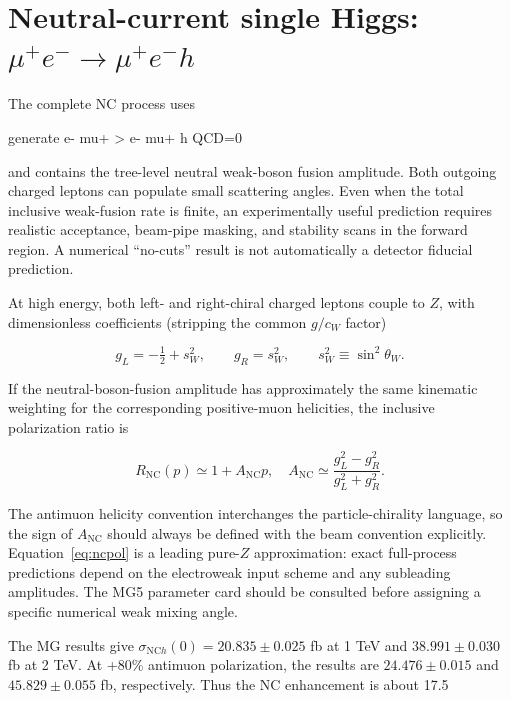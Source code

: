 \documentclass[12pt,a4paper]{article}
\newcommand{\newnote}{\clearpage}
\newcommand{\NC}{\mathrm{NC}}
\begin{document}
\newnote

\section{Neutral-current single Higgs: $\mu^+e^-\to\mu^+e^-h$}
The complete NC process uses
\begin{center}\ttfamily\small generate e- mu+ > e- mu+ h QCD=0\end{center}

and contains the tree-level neutral weak-boson fusion amplitude. Both outgoing charged leptons can populate small scattering angles. Even when the total inclusive weak-fusion rate is finite, an experimentally useful prediction requires realistic acceptance, beam-pipe masking, and stability scans in the forward region. A numerical ``no-cuts'' result is not automatically a detector fiducial prediction.

At high energy, both left- and right-chiral charged leptons couple to $Z$, with dimensionless coefficients (stripping the common $g/c_W$ factor)

\begin{equation}
 g_L=-\tfrac12+s_W^2,\qquad g_R=s_W^2,
 \qquad s_W^2\equiv\sin^2\theta_W.
\end{equation}

If the neutral-boson-fusion amplitude has approximately the same kinematic weighting for the corresponding positive-muon helicities, the inclusive polarization ratio is

\begin{equation}
\label{eq:ncpol}
R_{\NC}(p)\simeq1+A_{\NC}p,\quad
A_{\NC}\simeq\frac{g_L^2-g_R^2}{g_L^2+g_R^2}.
\end{equation}

The antimuon helicity convention interchanges the particle-chirality language, so the sign of $A_{\NC}$ should always be defined with the beam convention explicitly. Equation~\eqref{eq:ncpol} is a leading pure-$Z$ approximation: exact full-process predictions depend on the electroweak input scheme and any subleading amplitudes. The MG5 parameter card should be consulted before assigning a specific numerical weak mixing angle.

The MG results give $\sigma_{\NC h}(0)=20.835\pm0.025$ fb at 1 TeV and $38.991\pm0.030$ fb at 2 TeV. At +80\% antimuon polarization, the results are $24.476\pm0.015$ and $45.829\pm0.055$ fb, respectively. Thus the NC enhancement is about 17.5%
\end{document}
